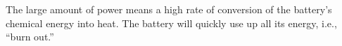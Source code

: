 The large amount of power means a high rate of conversion of the
battery's chemical energy into heat. The battery will quickly use up all its energy, i.e.,
``burn out.''



